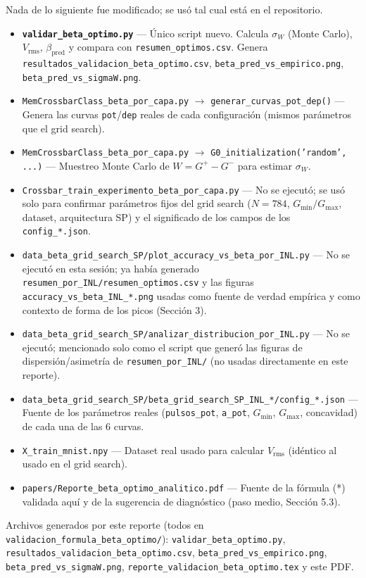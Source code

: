 \documentclass[11pt]{article}
\begin{document}
Nada de lo siguiente fue modificado; se usó tal cual está en el
repositorio.

\begin{itemize}
\item \textbf{\texttt{validar\_beta\_optimo.py}} --- Único script nuevo.
  Calcula $\sigma_W$ (Monte Carlo), $V_{\mathrm{rms}}$, $\beta_{\mathrm{pred}}$
  y compara con \texttt{resumen\_optimos.csv}. Genera
  \texttt{resultados\_validacion\_beta\_optimo.csv},
  \texttt{beta\_pred\_vs\_empirico.png}, \texttt{beta\_pred\_vs\_sigmaW.png}.
\item \texttt{MemCrossbarClass\_beta\_por\_capa.py}
  $\to$ \texttt{generar\_curvas\_pot\_dep()} --- Genera las curvas
  \texttt{pot}/\texttt{dep} reales de cada configuración (mismos parámetros
  que el grid search).
\item \texttt{MemCrossbarClass\_beta\_por\_capa.py}
  $\to$ \texttt{G0\_initialization('random', ...)} --- Muestreo Monte Carlo
  de $W=G^+-G^-$ para estimar $\sigma_W$.
\item \texttt{Crossbar\_train\_experimento\_beta\_por\_capa.py} --- No se
  ejecutó; se usó solo para confirmar parámetros fijos del grid search
  ($N=784$, $G_{\min}/G_{\max}$, dataset, arquitectura SP) y el significado
  de los campos de los \texttt{config\_*.json}.
\item \texttt{data\_beta\_grid\_search\_SP/plot\_accuracy\_vs\_beta\_por\_INL.py}
  --- No se ejecutó en esta sesión; ya había generado
  \texttt{resumen\_por\_INL/resumen\_optimos.csv} y las figuras
  \texttt{accuracy\_vs\_beta\_INL\_*.png} usadas como fuente de verdad
  empírica y como contexto de forma de los picos (Sección 3).
\item \texttt{data\_beta\_grid\_search\_SP/analizar\_distribucion\_por\_INL.py}
  --- No se ejecutó; mencionado solo como el script que generó las figuras
  de dispersión/asimetría de \texttt{resumen\_por\_INL/} (no usadas
  directamente en este reporte).
\item \texttt{data\_beta\_grid\_search\_SP/beta\_grid\_search\_SP\_INL\_*/config\_*.json}
  --- Fuente de los parámetros reales (\texttt{pulsos\_pot},
  \texttt{a\_pot}, $G_{\min}$, $G_{\max}$, concavidad) de cada una de las 6
  curvas.
\item \texttt{X\_train\_mnist.npy} --- Dataset real usado para calcular
  $V_{\mathrm{rms}}$ (idéntico al usado en el grid search).
\item \texttt{papers/Reporte\_beta\_optimo\_analitico.pdf} --- Fuente de la
  fórmula (*) validada aquí y de la sugerencia de diagnóstico (paso medio,
  Sección 5.3).
\end{itemize}

Archivos generados por este reporte (todos en
\texttt{validacion\_formula\_beta\_optimo/}): \texttt{validar\_beta\_optimo.py},
\texttt{resultados\_validacion\_beta\_optimo.csv},
\texttt{beta\_pred\_vs\_empirico.png}, \texttt{beta\_pred\_vs\_sigmaW.png},
\texttt{reporte\_validacion\_beta\_optimo.tex} y este PDF.
\end{document}
